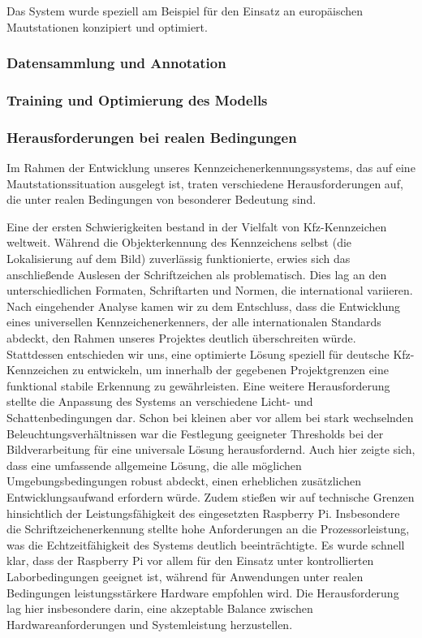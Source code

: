 Das System wurde speziell am Beispiel für den Einsatz an europäischen Mautstationen konzipiert und optimiert. 
\subsubsection{Datensammlung und Annotation}
\subsubsection{Training und Optimierung des Modells}
\subsubsection{Herausforderungen bei realen Bedingungen}
Im Rahmen der Entwicklung unseres Kennzeichenerkennungssystems, das auf eine Mautstationssituation ausgelegt ist, traten verschiedene Herausforderungen auf, die unter realen Bedingungen von besonderer Bedeutung sind. \singlespacing

Eine der ersten Schwierigkeiten bestand in der Vielfalt von Kfz-Kennzeichen weltweit. 
 Während die Objekterkennung des Kennzeichens selbst (die Lokalisierung auf dem Bild) zuverlässig funktionierte, erwies sich das anschließende Auslesen der Schriftzeichen als problematisch. 
 Dies lag an den unterschiedlichen Formaten, Schriftarten und Normen, die international variieren. 
 Nach eingehender Analyse kamen wir zu dem Entschluss, dass die Entwicklung eines universellen Kennzeichenerkenners, der alle internationalen Standards abdeckt, den Rahmen unseres Projektes deutlich überschreiten würde. 
 Stattdessen entschieden wir uns, eine optimierte Lösung speziell für deutsche Kfz-Kennzeichen zu entwickeln, um innerhalb der gegebenen Projektgrenzen eine funktional stabile Erkennung zu gewährleisten.\singlespacing
 Eine weitere Herausforderung stellte die Anpassung des Systems an verschiedene Licht- und Schattenbedingungen dar. 
 Schon bei kleinen aber vor allem bei stark wechselnden Beleuchtungsverhältnissen war die Festlegung geeigneter Thresholds bei der Bildverarbeitung für eine universale Lösung herausfordernd. 
 Auch hier zeigte sich, dass eine umfassende allgemeine Lösung, die alle möglichen Umgebungsbedingungen robust abdeckt, einen erheblichen zusätzlichen Entwicklungsaufwand erfordern würde. \singlespacing
 Zudem stießen wir auf technische Grenzen hinsichtlich der Leistungsfähigkeit des eingesetzten Raspberry Pi.
Insbesondere die Schriftzeichenerkennung stellte hohe Anforderungen an die Prozessorleistung, was die Echtzeitfähigkeit des Systems deutlich beeinträchtigte.
Es wurde schnell klar, dass der Raspberry Pi vor allem für den Einsatz unter kontrollierten Laborbedingungen geeignet ist, während für Anwendungen unter realen Bedingungen leistungsstärkere Hardware empfohlen wird.
Die Herausforderung lag hier insbesondere darin, eine akzeptable Balance zwischen Hardwareanforderungen und Systemleistung herzustellen.

